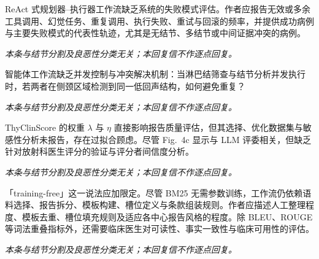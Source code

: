 \begin{reviewercomment}
ReAct 式规划器–执行器工作流缺乏系统的失败模式评估。作者应报告无效或多余工具调用、幻觉任务、重复调用、执行失败、重试与回滚的频率，并提供成功病例与主要失败模式的代表性轨迹，尤其是无结节、多结节或中间证据冲突的病例。
\end{reviewercomment}
\begin{authorresponse}
\noindent\textit{本条与结节分割及良恶性分类无关；本回复信不作逐点回复。}
\end{authorresponse}

\begin{reviewercomment}
智能体工作流缺乏并发控制与冲突解决机制：当淋巴结筛查与结节分析并发执行时，若两者在侧颈区域检测到同一低回声结构，如何避免重复？
\end{reviewercomment}
\begin{authorresponse}
\noindent\textit{本条与结节分割及良恶性分类无关；本回复信不作逐点回复。}
\end{authorresponse}

\begin{reviewercomment}
ThyClinScore 的权重 $\lambda$ 与 $\eta$ 直接影响报告质量评估，但其选择、优化数据集与敏感性分析未报告，存在过拟合顾虑。尽管 Fig.~4c 显示与 LLM 评委相关，但缺乏针对放射科医生评分的验证与评分者间信度分析。
\end{reviewercomment}
\begin{authorresponse}
\noindent\textit{本条与结节分割及良恶性分类无关；本回复信不作逐点回复。}
\end{authorresponse}

\begin{reviewercomment}
「training-free」这一说法应加限定。尽管 BM25 无需参数训练，工作流仍依赖语料选择、报告拆分、模板构建、槽位定义与条款组装规则。作者应描述人工整理程度、模板去重、槽位填充规则及适应各中心报告风格的程度。除 BLEU、ROUGE 等词法重叠指标外，还需要临床医生对可读性、事实一致性与临床可用性的评估。
\end{reviewercomment}
\begin{authorresponse}
\noindent\textit{本条与结节分割及良恶性分类无关；本回复信不作逐点回复。}
\end{authorresponse}


